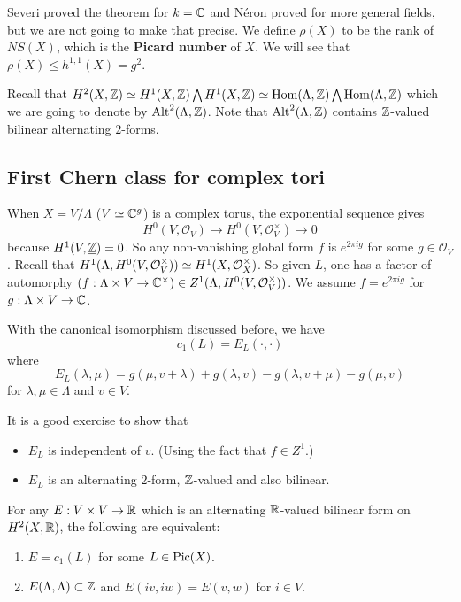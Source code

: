 Severi proved the theorem for $k={\mathbb C}$ and N\'{e}ron proved for more general fields, but we are not going to make that precise. We define $\rho(X)$ to be the rank of $NS(X)$, which is the \textbf{Picard number} of $X$. We will see that $\rho(X)\leq h^{1,1}(X)=g^2$. 

Recall that $H^2(X,{\mathbb Z})\simeq H^1(X,{\mathbb Z})\bigwedge H^1(X,{\mathbb Z})\simeq \operatorname{Hom}(\Lambda,{\mathbb Z})\bigwedge \operatorname{Hom}(\Lambda,{\mathbb Z})$ which we are going to denote by $\text{Alt}^2(\Lambda,{\mathbb Z})$. Note that $\text{Alt}^2(\Lambda,{\mathbb Z})$ contains ${\mathbb Z}$-valued bilinear alternating $2$-forms. 

\subsection{First Chern class for complex tori}
When $X=V/\Lambda$ ($V\simeq {\mathbb C}^g$) is a complex torus, the exponential sequence gives 
$$H^0(V,\mathcal{O}_V)\to H^0(V,\mathcal{O}_V^\times)\to 0$$
because $H^1(V,\underline{{\mathbb Z}})=0$. So any non-vanishing global form $f$ is $e^{2\pi i g} $ for some $g\in \mathcal{O}_V$. Recall that $H^1(\Lambda,H^0(V,\mathcal{O}_V^\times))\simeq H^1(X,\mathcal{O}_X^\times)$. So given $L$, one has a factor of automorphy $(f:\Lambda\times V\to {\mathbb C}^\times)\in Z^1(\Lambda,H^0(V,\mathcal{O}_V^\times))$. We assume $f=e^{2\pi i g}$ for $g:\Lambda \times V\to {\mathbb C}$. 

\begin{theorem}
With the canonical isomorphism discussed before, we have 
$$c_1(L)=E_L(\cdot,\cdot)$$
where
$$E_L(\lambda,\mu)=g(\mu,v+\lambda)+g(\lambda,v)-g(\lambda,v+\mu)-g(\mu, v)$$
for $\lambda,\mu\in \Lambda$ and $v\in V$.
\end{theorem}

It is a good exercise to show that 
\begin{itemize}
\item $E_L$ is independent of $v$. (Using the fact that $f\in Z^1$.)
\item $E_L$ is an alternating $2$-form, ${\mathbb Z}$-valued and also bilinear. 
\end{itemize}
 

\begin{theorem}
For any $E:V\times V\to {\mathbb R}$ which is an alternating ${\mathbb R}$-valued bilinear form on $H^2(X,{\mathbb R})$, the following are equivalent:
\begin{enumerate}
\item $E=c_1(L)$ for some $L\in \operatorname{Pic}(X)$.
\item $E(\Lambda,\Lambda)\subset {\mathbb Z}$ and $E(iv,iw)=E(v,w)$ for $i\in V$.
\end{enumerate}
\end{theorem}

